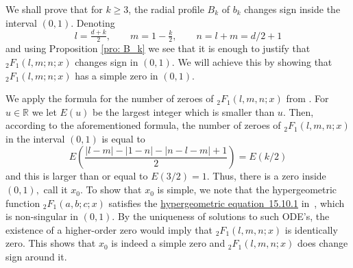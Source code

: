 \documentclass[a4paper,12pt,reqno]{amsart}
\numberwithin{equation}{section}
\theoremstyle{definition}
\newcommand{\R}{\mathbb{R}}
\renewcommand{\ge}{\geqslant}
\begin{document}
We shall prove that for $k\ge 3$, the radial profile $B_k$ of $b_k$ changes sign inside the interval $(0,1)$. Denoting
\[
l=\tfrac{d + k}{2},\qquad m=1 - \tfrac{k}{2},\qquad n=l+m=d/2+1
\]
and using Proposition \ref{pro: B_k} we see that it is enough to justify that ${_2F_1}(l, m; n; x)$ changes sign in $(0,1).$ We will achieve this by showing that ${_2F_1}(l, m; n; x)$ has a simple zero in $(0,1)$. 




 We apply the formula for the number of zeroes of ${_2}F_1(l,m,n;x)$ from \cite[p.\ 586, eq.\ (18)]{Klein1}. For $u\in \R$ we let $E(u)$ be the largest integer 
which is smaller than $u.$ Then, according to the aforementioned formula, the number of zeroes of ${_2}F_1(l,m,n;x)$ in the interval $(0,1)$ is equal to
\[
E\left(\frac{|l-m|-|1-n|-|n-l-m|+1}{2}\right)=E(k/2)
\]
and this is larger than or equal to $E(3/2)=1.$ Thus, there is a zero inside $(0,1),$ call it $x_0$. To show that $x_0$ is simple, we note that the hypergeometric function ${_2F_1}(a, b; c; x)$ satisfies the  \href{https://dlmf.nist.gov/15.10.E1}{hypergeometric equation~15.10.1} in~\cite{dlmf}, which is non-singular in $(0,1).$ By the uniqueness of solutions to such ODE's, the existence of a higher-order zero would imply that ${_2}F_1(l,m,n;x)$ is identically zero. This shows that $x_0$ is indeed a simple zero and ${_2}F_1(l,m,n;x)$ does change sign around it.
\end{document}
